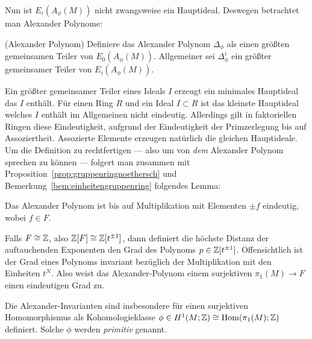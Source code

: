     	Nun ist $E_i(A_\phi(M))$ nicht zwangsweise ein Hauptideal. Deswegen betrachtet man Alexander Polynome:
    	\begin{defn}(Alexander Polynom)
    		Definiere das Alexander Polynom $\Delta_\phi$ als einen größten gemeinsamen Teiler von $E_0(A_\phi(M))$. Allgemeiner sei $\Delta_\phi^i$ ein größter gemeinsamer Teiler von $E_i(A_\phi(M))$.
    	\end{defn}
    	Ein größter gemeinsamer Teiler eines Ideals $I$ erzeugt ein minimales Hauptideal das $I$ enthält. Für einen Ring $R$ und ein Ideal $I\subset R$ ist das kleinste Hauptideal welches $I$ enthält im Allgemeinen nicht eindeutig. Allerdings gilt in faktoriellen Ringen diese Eindeutigkeit, aufgrund der Eindeutigkeit der Primzerlegung bis auf Assoziertheit. Assozierte Elemente erzeugen natürlich die gleichen Hauptideale. Um die Definition zu rechtfertigen --- also um von \emph{dem} Alexander Polynom sprechen zu können --- folgert man zusammen mit Proposition~\ref{prop:gruppenringnoethersch} und Bemerkung~\ref{bem:einheitengruppenring} folgendes Lemma:
    	\begin{lem}
    		Das Alexander Polynom ist bis auf Multiplikation mit Elementen $\pm f$ eindeutig, wobei $f\in F$.
    	\end{lem}

    	\begin{bem}
    		Falls $F \cong \mathbb{Z}$, also $\mathbb{Z}[F]\cong \mathbb{Z}[t^{\pm 1}]$, dann definiert die höchste Distanz der auftauchenden Exponenten den Grad des Polynoms $p \in \mathbb{Z}[t^{\pm 1}]$. Offensichtlich ist der Grad eines Polynoms invariant bezüglich der Multiplikation mit den Einheiten $t^N$. Also weist das Alexander-Polynom einem surjektiven $\pi_1(M)\to F$ einen eindeutigen Grad zu.
    	\end{bem}

    	 Die Alexander-Invarianten sind insbesondere für einen surjektiven Homomorphismus als Kohomologieklasse $\phi\in H^1(M;\mathbb{Z}) \cong \operatorname{Hom}(\pi_1(M);\mathbb{Z})$ definiert. Solche $\phi$ werden \emph{primitiv} genannt. 
   		
